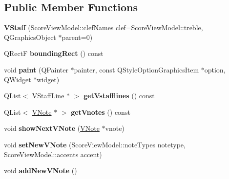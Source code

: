 \subsection*{Public Member Functions}
\begin{DoxyCompactItemize}
\item 
\hypertarget{class_v_staff_ad435840f63524510afd6721ffe054a37}{}{\bfseries V\+Staff} (Score\+View\+Model\+::clef\+Names clef=Score\+View\+Model\+::treble, Q\+Graphics\+Object $\ast$parent=0)\label{class_v_staff_ad435840f63524510afd6721ffe054a37}

\item 
\hypertarget{class_v_staff_ade19faa451d9ce058cddcafeacb5a432}{}Q\+Rect\+F {\bfseries bounding\+Rect} () const \label{class_v_staff_ade19faa451d9ce058cddcafeacb5a432}

\item 
\hypertarget{class_v_staff_aeefc796be13d05ddc8bfee7ff49ee5b6}{}void {\bfseries paint} (Q\+Painter $\ast$painter, const Q\+Style\+Option\+Graphics\+Item $\ast$option, Q\+Widget $\ast$widget)\label{class_v_staff_aeefc796be13d05ddc8bfee7ff49ee5b6}

\item 
\hypertarget{class_v_staff_af6260222d1f6c5af860edeee4e5ad2e2}{}Q\+List$<$ \hyperlink{class_v_staff_line}{V\+Staff\+Line} $\ast$ $>$ {\bfseries get\+Vstafflines} () const \label{class_v_staff_af6260222d1f6c5af860edeee4e5ad2e2}

\item 
\hypertarget{class_v_staff_a37e2606c7ff7e487059337274c706c2b}{}Q\+List$<$ \hyperlink{class_v_note}{V\+Note} $\ast$ $>$ {\bfseries get\+Vnotes} () const \label{class_v_staff_a37e2606c7ff7e487059337274c706c2b}

\item 
\hypertarget{class_v_staff_af0e303b975eb997e6e11bd7696bf8ead}{}void {\bfseries show\+Next\+V\+Note} (\hyperlink{class_v_note}{V\+Note} $\ast$vnote)\label{class_v_staff_af0e303b975eb997e6e11bd7696bf8ead}

\item 
\hypertarget{class_v_staff_a7ca9cc1d027b2796047aff5020fa195b}{}void {\bfseries set\+New\+V\+Note} (Score\+View\+Model\+::note\+Types notetype, Score\+View\+Model\+::accents accent)\label{class_v_staff_a7ca9cc1d027b2796047aff5020fa195b}

\item 
\hypertarget{class_v_staff_a5560aebaca63c903d6514674a090716a}{}void {\bfseries add\+New\+V\+Note} ()\label{class_v_staff_a5560aebaca63c903d6514674a090716a}


\end{DoxyCompactItemize}
